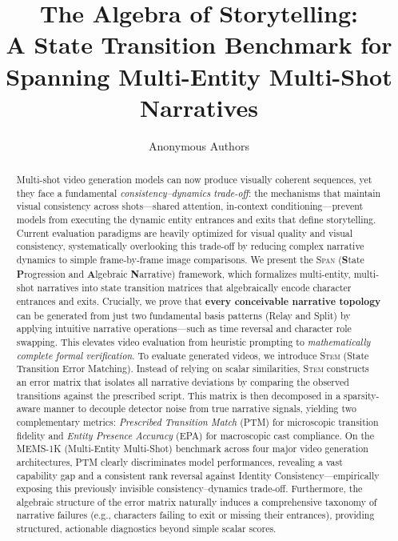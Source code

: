 \documentclass[sigconf,review,anonymous]{acmart}
\theoremstyle{definition}
\newcommand{\diagonal}{\textsc{Span}}
\newcommand{\stem}{\textsc{Stem}}
\begin{document}
\title{The Algebra of Storytelling:\\A State Transition Benchmark for Spanning Multi-Entity Multi-Shot Narratives}

\author{Anonymous Authors}
\begin{abstract}
Multi-shot video generation models can now produce visually coherent sequences, yet they face a fundamental \emph{consistency--dynamics trade-off}: the mechanisms that maintain visual consistency across shots---shared attention, in-context conditioning---prevent models from executing the dynamic entity entrances and exits that define storytelling.
Current evaluation paradigms are heavily optimized for visual quality and visual consistency, systematically overlooking this trade-off by reducing complex narrative dynamics to simple frame-by-frame image comparisons.
We present the \diagonal{} (\textbf{S}tate \textbf{P}rogression and \textbf{A}lgebraic \textbf{N}arrative) framework, which formalizes multi-entity, multi-shot narratives into state transition matrices that algebraically encode character entrances and exits. 
Crucially, we prove that \textbf{every conceivable narrative topology} can be generated from just two fundamental basis patterns (Relay and Split) by applying intuitive narrative operations---such as time reversal and character role swapping.
This elevates video evaluation from heuristic prompting to \emph{mathematically complete formal verification}.
To evaluate generated videos, we introduce \stem{} (State Transition Error Matching). Instead of relying on scalar similarities, \stem{} constructs an error matrix that isolates all narrative deviations by comparing the observed transitions against the prescribed script. This matrix is then decomposed in a sparsity-aware manner to decouple detector noise from true narrative signals, yielding two complementary metrics: \emph{Prescribed Transition Match} (PTM) for microscopic transition fidelity and \emph{Entity Presence Accuracy} (EPA) for macroscopic cast compliance.
On the MEMS-1K (Multi-Entity Multi-Shot) benchmark across four major video generation architectures, PTM clearly discriminates model performances, revealing a vast capability gap and a consistent rank reversal against Identity Consistency---empirically exposing this previously invisible consistency--dynamics trade-off.
Furthermore, the algebraic structure of the error matrix naturally induces a comprehensive taxonomy of narrative failures (e.g., characters failing to exit or missing their entrances), providing structured, actionable diagnostics beyond simple scalar scores.
\end{abstract}
\end{document}
